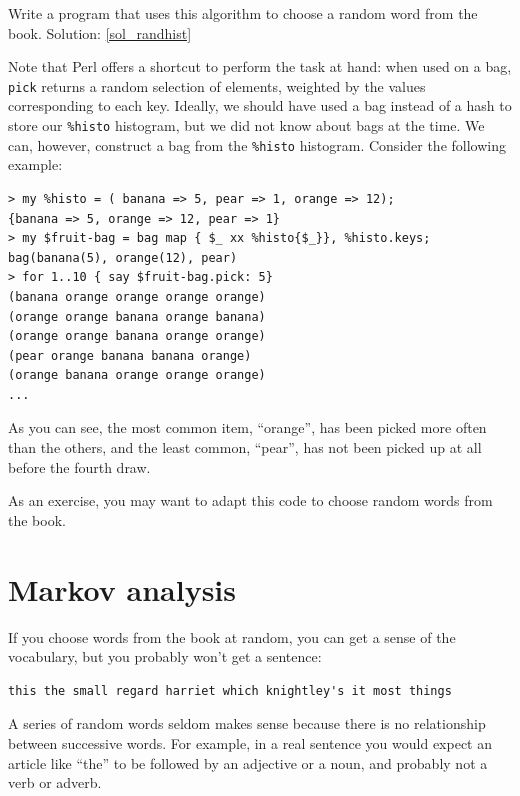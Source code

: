 \begin{exercise}
\label{randhist}

Write a program that uses this algorithm to choose a random word from
the book.  
Solution: \ref{sol_randhist}
\end{exercise}

Note that Perl offers a shortcut to perform the task 
at hand: when used on a bag, {\tt pick} returns a random 
selection of elements, weighted by the values corresponding 
to each key. Ideally, we should have used a bag instead of 
a hash to store our \verb'%histo' histogram, but we did not 
know about bags at the time. We can, however, construct a 
bag from the \verb'%histo' histogram. Consider the following 
example:

\begin{verbatim}
> my %histo = ( banana => 5, pear => 1, orange => 12);
{banana => 5, orange => 12, pear => 1}
> my $fruit-bag = bag map { $_ xx %histo{$_}}, %histo.keys;
bag(banana(5), orange(12), pear)
> for 1..10 { say $fruit-bag.pick: 5}
(banana orange orange orange orange)
(orange orange banana orange banana)
(orange orange banana orange orange)
(pear orange banana banana orange)
(orange banana orange orange orange)
...
\end{verbatim}

As you can see, the most common item, ``orange'', has been 
picked more often than the others, and the least common, 
``pear'', has not been picked up at all before the fourth 
draw. 

As an exercise, you may want to adapt this code to 
choose random words from the book.



\section{Markov analysis}
\label{markov}

If you choose words from the book at random, you can get a
sense of the vocabulary, but you probably won't get a sentence:

\begin{verbatim}
this the small regard harriet which knightley's it most things
\end{verbatim}
%
A series of random words seldom makes sense because there
is no relationship between successive words.  For example, in
a real sentence you would expect an article like ``the'' to
be followed by an adjective or a noun, and probably not a verb
or adverb.

